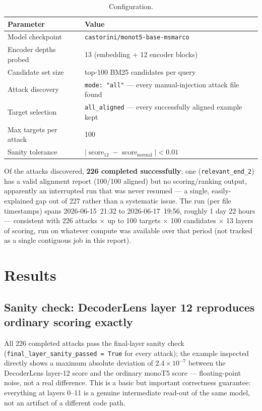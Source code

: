 \documentclass[11pt]{article}
\newcommand{\score}{\operatorname{score}}
\begin{document}
\begin{table}[H]
\centering
\caption{Configuration.}
\begin{tabular}{ll}
\toprule
Parameter & Value \\
\midrule
Model checkpoint & \texttt{castorini/monot5-base-msmarco} \\
Encoder depths probed & 13 (embedding + 12 encoder blocks) \\
Candidate set size & top-100 BM25 candidates per query \\
Attack discovery & \texttt{mode: "all"} — every manual-injection attack file found \\
Target selection & \texttt{all\_aligned} — every successfully aligned example kept \\
Max targets per attack & 100 \\
Sanity tolerance & $|\score_{12} - \score_{\text{normal}}| < 0.01$ \\
\bottomrule
\end{tabular}
\end{table}

Of the attacks discovered, \textbf{226 completed successfully}; one
(\texttt{relevant\_end\_2}) has a valid alignment report (100/100 aligned)
but no scoring/ranking output, apparently an interrupted run that was never
resumed — a single, easily-explained gap out of 227 rather than a
systematic issue. The run (per file timestamps) spans
2026-06-15~21:32 to 2026-06-17~19:56, roughly 1 day 22 hours — consistent
with 226 attacks $\times$ up to 100 targets $\times$ 100 candidates
$\times$ 13 layers of scoring, run on whatever compute was available over
that period (not tracked as a single contiguous job in this report).

\section{Results}
\label{sec:results}

\subsection{Sanity check: DecoderLens layer 12 reproduces ordinary scoring exactly}

All 226 completed attacks pass the final-layer sanity check
(\texttt{final\_layer\_sanity\_passed = True} for every attack); the
example inspected directly shows a maximum absolute deviation of
$2.4\times10^{-7}$ between the DecoderLens layer-12 score and the ordinary
monoT5 score — floating-point noise, not a real difference. This is a
basic but important correctness guarantee: everything at layers 0--11 is a
genuine intermediate read-out of the same model, not an artifact of a
different code path.
\end{document}
